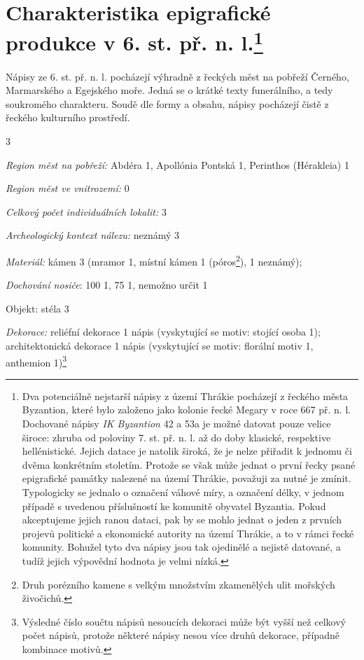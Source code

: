 
\section[charakteristika-epigrafické-produkce-v-6.-st.-př.-n.-l.]{Charakteristika epigrafické produkce v 6. st. př. n. l.\footnote{Dva potenciálně nejstarší nápisy z území Thrákie pocházejí z řeckého města Byzantion, které bylo založeno jako kolonie řecké Megary v roce 667 př. n. l. Dochované nápisy {\em IK Byzantion} 42 a 53a je možné datovat pouze velice široce: zhruba od poloviny 7. st. př. n. l. až do doby klasické, respektive hellénistické. Jejich datace je natolik široká, že je nelze přiřadit k jednomu či dvěma konkrétním stoletím. Protože se však může jednat o první řecky psané epigrafické památky nalezené na území Thrákie, považuji za nutné je zmínit. Typologicky se jednalo o označení váhové míry, a označení délky, v jednom případě s uvedenou příslušností ke komunitě obyvatel Byzantia. Pokud akceptujeme jejich ranou dataci, pak by se mohlo jednat o jeden z prvních projevů politické a ekonomické autority na území Thrákie, a to v rámci řecké komunity. Bohužel tyto dva nápisy jsou tak ojedinělé a nejistě datované, a tudíž jejich výpovědní hodnota je velmi nízká.}}

Nápisy ze 6. st. př. n. l. pocházejí výhradně z řeckých měst na pobřeží Černého, Marmarského a Egejského moře. Jedná se o krátké texty funerálního, a tedy soukromého charakteru. Soudě dle formy a obsahu, nápisy pocházejí čistě z řeckého kulturního prostředí.

\placetable[none]{}
\starttable[|l|]
\HL
{} 3

{\em Region měst na pobřeží:} Abdéra 1, Apollónia Pontská 1, Perinthos (Hérakleia) 1

{\em Region měst ve vnitrozemí:} 0

{\em Celkový počet individuálních lokalit:} 3

{\em Archeologický kontext nálezu:} neznámý 3

{\em Materiál:} kámen 3 (mramor 1, místní kámen 1 (póros\footnote{Druh porézního kamene s velkým množstvím zkamenělých ulit mořských živočichů.}), 1 neznámý);

{\em Dochování nosiče}: 100  1, 75  1, nemožno určit 1

Objekt: stéla 3

{\em Dekorace:} reliéfní dekorace 1 nápis (vyskytující se motiv: stojící osoba 1); architektonická dekorace 1 nápis (vyskytující se motiv: florální motiv 1, anthemion 1)\footnote{Výsledné číslo součtu nápisů nesoucích dekoraci může být vyšší než celkový počet nápisů, protože některé nápisy nesou více druhů dekorace, případně kombinace motivů.}


